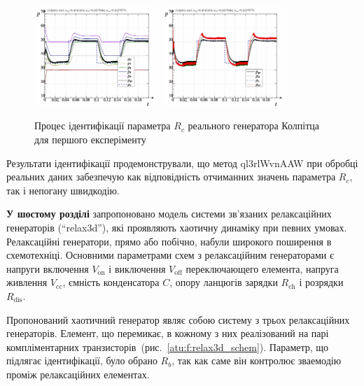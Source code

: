 \documentclass[a4paper,13pt]{atuaref}
\newcommand{\Tidx}[1]{%
  _\mathrm{#1}
}
\begin{document}
\begin{figure}[htb!]
  \centerline{
    \includegraphics[width=0.42\textwidth]{p6/p/colp_real_id_qi_fv5-p_p_01.png}
    \hfill
    \includegraphics[width=0.42\textwidth]{p6/p/colp_real_id_qi_fv5-p_pp_01.png}
  }
  \caption{Процес ідентифікації параметра $ R_c $ реального генератора Колпітца для першого експеріменту}
  \label{atu:f:colp_r_id_1}
\end{figure}

Результати ідентифікації продемонстрували, що метод ql3rlWvnAAW
при обробці реальних даних забезпечую как відповідність отчиманних значень параметра $R_c$,
так і непогану швидкодію.



\textbf{У шостому розділі}
запропоновано модель
системи зв'язаних релаксаційних генераторів (``relax3d''),
які проявляють хаотичну динаміку при певних умовах.
Релаксаційні генератори, прямо або побічно, набули широкого поширення в схемотехніці.
Основними параметрами схем з релаксаційним генераторами є напруги включення
$ V\Tidx{on} $ і виключення $ V \Tidx{off} $ переключающего елемента,
напруга живлення $ V\Tidx{cc} $, ємність конденсатора $C$, опору ланцюгів
зарядки $ R\Tidx{ch} $ і розрядки $ R\Tidx {dis} $.

Пропонований хаотичний генератор являє собою систему з трьох релаксаційних
генераторів. Елемент, що перемикає, в кожному з них реалізований на парі
компліментарних транзисторів~(рис.~\ref{atu:f:relax3d_schem}).
Параметр, що підлягає ідентифікації, було обрано $R_b$,
так как саме він контролює зваемодію проміж релаксаційних елементах.
\end{document}
